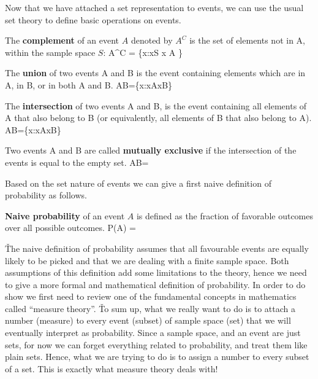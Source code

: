 
Now that we have attached a set representation to events, we can use the usual set theory to define basic operations 
on events.

The \textbf{complement} of an event $A$ denoted by $A^{C}$ is the set of elements not in A, within the sample space $S$:
\bse
A^{C} = \{x:x\in S \mid x \notin A \}
\ese
\ed

\vspace{-5pt}


\bd[Union]
The \textbf{union} of two events A and B is the event containing elements which are in A, in B, or in both A and B\@.
\bse
A\cup B=\{x:x\in A{}x\in B\}
\ese
\ed


\bd[Intersection]
The \textbf{intersection} of two events A and B, is the event containing all elements of A that also belong to B (or 
equivalently, all elements of B that also belong to A).
\bse
A\cap B=\{x:x\in A{}x\in B\}
\ese
\ed

\vspace{-5pt}


Two events A and B are called \textbf{mutually exclusive} if the intersection of the events is equal to the empty set.
\bse
A\cap B= \emptyset
\ese
\ed


Based on the set nature of events we can give a first naive definition of probability as follows.

\textbf{Naive probability} of an event $A$ is defined as the fraction of favorable outcomes over all possible outcomes.
\bse
P(A) = 
\ese
\ed

\v

The naive definition of probability assumes that all favourable events are equally likely to be picked and that we 
are dealing with a finite sample space. Both assumptions of this definition add some limitations to the theory, hence
we need to give a more formal and mathematical definition of probability. In order to do show we first need to review
one of the fundamental concepts in mathematics called ``measure theory''. \v

To sum up, what we really want to do is to attach a number (measure) to every event (subset) of sample space (set) 
that we will eventually interpret as probability. Since a sample space, and an event are just sets, for now we can 
forget everything related to probability, and treat them like plain sets. Hence, what we are trying to do is to
assign a number to every subset of a set. This is exactly what measure theory deals with!

